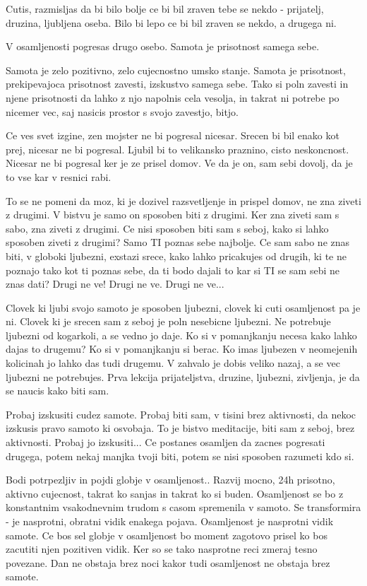 Cutis, razmisljas da bi bilo bolje ce bi bil zraven tebe se nekdo - prijatelj, druzina, ljubljena oseba. Bilo bi lepo ce bi bil zraven se nekdo, a drugega ni. 

V osamljenosti pogresas drugo osebo. Samota je prisotnost samega sebe. 

Samota je zelo pozitivno, zelo cujecnostno umsko stanje. Samota je prisotnost, prekipevajoca prisotnost zavesti, izskustvo samega sebe. Tako si poln zavesti in njene prisotnosti da lahko z njo napolnis cela vesolja, in takrat ni potrebe po nicemer vec, saj nasicis prostor s svojo zavestjo, bitjo. 

Ce ves svet izgine, zen mojster ne bi pogresal nicesar. Srecen bi bil enako kot prej, nicesar ne bi pogresal. Ljubil bi to velikansko praznino, cisto neskoncnost. Nicesar ne bi pogresal ker je ze prisel domov. Ve da je on, sam sebi dovolj, da je to vse kar v resnici rabi. 

To se ne pomeni da moz, ki je dozivel razsvetljenje in prispel domov, ne zna ziveti z drugimi. V bistvu je samo on sposoben biti z drugimi. Ker zna ziveti sam s sabo, zna ziveti z drugimi. Ce nisi sposoben biti sam s seboj, kako si lahko sposoben ziveti z drugimi? Samo TI poznas sebe najbolje. Ce sam sabo ne znas biti, v globoki ljubezni, exstazi srece, kako lahko pricakujes od drugih, ki te ne poznajo tako kot ti poznas sebe, da ti bodo dajali to kar si TI se sam sebi ne znas dati? Drugi ne ve! Drugi ne ve. Drugi ne ve... 

Clovek ki ljubi svojo samoto je sposoben ljubezni, clovek ki cuti osamljenost pa je ni. Clovek ki je srecen sam z seboj je poln nesebicne ljubezni. Ne potrebuje ljubezni od kogarkoli, a se vedno jo daje. Ko si v pomanjkanju necesa kako lahko dajas to drugemu? Ko si v pomanjkanju si berac. Ko imas ljubezen v neomejenih kolicinah jo lahko das tudi drugemu. V zahvalo je dobis veliko nazaj, a se vec ljubezni ne potrebujes.  Prva lekcija prijateljstva, druzine, ljubezni, zivljenja, je da se naucis kako biti sam. 

Probaj izskusiti cudez samote. Probaj biti sam, v tisini brez aktivnosti, da nekoc izskusis pravo samoto ki osvobaja. To je bistvo meditacije, biti sam z seboj, brez aktivnosti. Probaj jo izskusiti... Ce postanes osamljen da zacnes pogresati drugega, potem nekaj manjka tvoji biti, potem se nisi sposoben razumeti kdo si. 

Bodi potrpezljiv in pojdi globje v osamljenost.. Razvij mocno, 24h prisotno, aktivno cujecnost, takrat ko sanjas in takrat ko si buden. Osamljenost se bo z konstantnim vsakodnevnim trudom s casom spremenila v samoto. Se transformira - je nasprotni, obratni vidik enakega pojava. Osamljenost je nasprotni vidik samote. Ce bos sel globje v osamljenost bo moment zagotovo prisel ko bos zacutiti njen pozitiven vidik. Ker so se tako nasprotne reci zmeraj tesno povezane. Dan ne obstaja brez noci kakor tudi osamljenost ne obstaja brez samote. 

